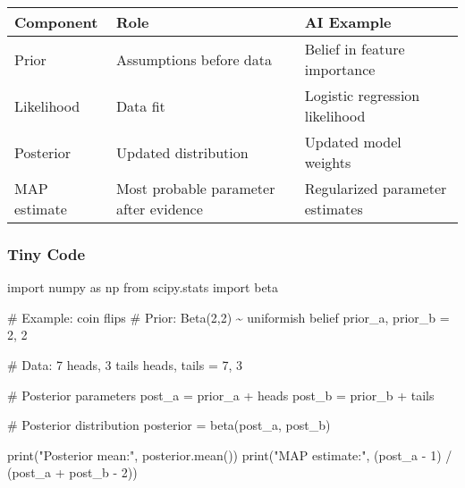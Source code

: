 \documentclass[
  letterpaper,
  DIV=11,
  numbers=noendperiod]{scrreprt}
\newenvironment{Shaded}{\begin{snugshade}}{\end{snugshade}}
\newcommand{\BuiltInTok}[1]{\textcolor[rgb]{0.00,0.23,0.31}{#1}}
\newcommand{\CommentTok}[1]{\textcolor[rgb]{0.37,0.37,0.37}{#1}}
\newcommand{\DecValTok}[1]{\textcolor[rgb]{0.68,0.00,0.00}{#1}}
\newcommand{\ImportTok}[1]{\textcolor[rgb]{0.00,0.46,0.62}{#1}}
\newcommand{\NormalTok}[1]{\textcolor[rgb]{0.00,0.23,0.31}{#1}}
\newcommand{\OperatorTok}[1]{\textcolor[rgb]{0.37,0.37,0.37}{#1}}
\newcommand{\StringTok}[1]{\textcolor[rgb]{0.13,0.47,0.30}{#1}}
\begin{document}
\begin{longtable}[]{@{}
  >{\raggedright\arraybackslash}p{}
  >{\raggedright\arraybackslash}p{}
  >{\raggedright\arraybackslash}p{}@{}}
\toprule\noalign{}
\begin{minipage}[b]{\linewidth}\raggedright
Component
\end{minipage} & \begin{minipage}[b]{\linewidth}\raggedright
Role
\end{minipage} & \begin{minipage}[b]{\linewidth}\raggedright
AI Example
\end{minipage} \\
\midrule\noalign{}
\endhead
\bottomrule\noalign{}
\endlastfoot
Prior & Assumptions before data & Belief in feature importance \\
Likelihood & Data fit & Logistic regression likelihood \\
Posterior & Updated distribution & Updated model weights \\
MAP estimate & Most probable parameter after evidence & Regularized
parameter estimates \\
\end{longtable}

\subsubsection{Tiny Code}\label{tiny-code-136}

\begin{Shaded}
\begin{Highlighting}[]
\ImportTok{import}\NormalTok{ numpy }\ImportTok{as}\NormalTok{ np}
\ImportTok{from}\NormalTok{ scipy.stats }\ImportTok{import}\NormalTok{ beta}

\CommentTok{\# Example: coin flips}
\CommentTok{\# Prior: Beta(2,2) \textasciitilde{} uniformish belief}
\NormalTok{prior\_a, prior\_b }\OperatorTok{=} \DecValTok{2}\NormalTok{, }\DecValTok{2}

\CommentTok{\# Data: 7 heads, 3 tails}
\NormalTok{heads, tails }\OperatorTok{=} \DecValTok{7}\NormalTok{, }\DecValTok{3}

\CommentTok{\# Posterior parameters}
\NormalTok{post\_a }\OperatorTok{=}\NormalTok{ prior\_a }\OperatorTok{+}\NormalTok{ heads}
\NormalTok{post\_b }\OperatorTok{=}\NormalTok{ prior\_b }\OperatorTok{+}\NormalTok{ tails}

\CommentTok{\# Posterior distribution}
\NormalTok{posterior }\OperatorTok{=}\NormalTok{ beta(post\_a, post\_b)}

\BuiltInTok{print}\NormalTok{(}\StringTok{"Posterior mean:"}\NormalTok{, posterior.mean())}
\BuiltInTok{print}\NormalTok{(}\StringTok{"MAP estimate:"}\NormalTok{, (post\_a }\OperatorTok{{-}} \DecValTok{1}\NormalTok{) }\OperatorTok{/}\NormalTok{ (post\_a }\OperatorTok{+}\NormalTok{ post\_b }\OperatorTok{{-}} \DecValTok{2}\NormalTok{))}
\end{Highlighting}
\end{Shaded}
\end{document}
